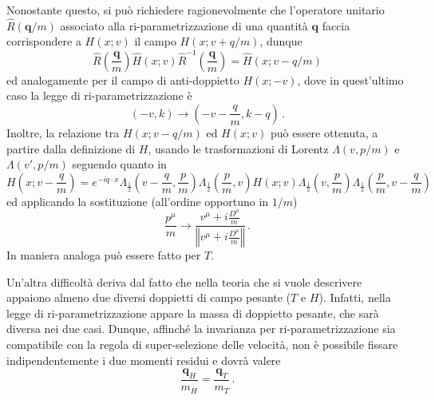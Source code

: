 \documentclass{article}
\begin{document}
Nonostante questo, si può richiedere ragionevolmente che l'operatore unitario $\hat{R}(\mathbf{q}/m)$ associato alla ri\hyp{}parametrizzazione di una quantità $\mathbf{q}$ faccia corrispondere a $H(x;v)$ il campo $H(x;v+q/m)$, dunque
\begin{equation}
  \hat{R}\left(\frac{\mathbf{q}}{m}\right) \hat{H}(x;v) \hat{R}^{-1}\left(\frac{\mathbf{q}}{m}\right) = \hat{H}(x; v-q/m) 
  \label{eq:reparametrization_law}
\end{equation}
ed analogamente per il campo di anti\hyp{}doppietto $H(x; -v)$, dove in quest'ultimo caso la legge di ri\hyp{}parametrizzazione è
\begin{equation}
  (-v, k) \to (-v - \frac{q}{m}, k - q) \, .
\end{equation}
Inoltre, la relazione tra $H(x;v-q/m)$ ed $H(x;v)$ può essere ottenuta, a partire dalla definizione di $H$, usando le trasformazioni di Lorentz $\Lambda(v,p/m)$ e $\Lambda(v',p/m)$ seguendo quanto in \cite{article:Luke_Manohar}
\begin{equation}
  H\left(x;v-\frac{q}{m}\right) = e^{- i q \cdot x} \Lambda_{\frac{1}{2}}\left(v-\frac{q}{m},\frac{p}{m}\right) \Lambda_{\frac{1}{2}}\left(\frac{p}{m}, v\right) H(x;v) \Lambda_{\frac{1}{2}}\left(v,\frac{p}{m}\right) \Lambda_{\frac{1}{2}}\left(\frac{p}{m}, v - \frac{q}{m}\right) 
\end{equation}
ed applicando la sostituzione (all'ordine opportuno in $1/m$)
\begin{equation}
  \frac{p^\mu}{m} \to \frac{v^\mu + i \frac{D^\mu}{m}}{\left\Vert v^\mu + i \frac{D^\mu}{m} \right\Vert} \, .
\end{equation}
In maniera analoga può essere fatto per $T$.

Un'altra difficoltà deriva dal fatto che nella teoria che si vuole descrivere appaiono almeno due diversi doppietti di campo pesante ($T$ e $H$). Infatti, nella legge di ri\hyp{}parametrizzazione appare la massa di doppietto pesante, che sarà diversa nei due casi. Dunque, affinché la invarianza per ri\hyp{}parametrizzazione sia compatibile con la regola di super\hyp{}selezione delle velocità, non è possibile fissare indipendentemente i due momenti residui e dovrà valere
\begin{equation}
  \frac{\mathbf{q}_H}{m_H} = \frac{\mathbf{q}_T}{m_T} \, .
  \label{eq:repar_momentum_constraint}
\end{equation}
\end{document}
